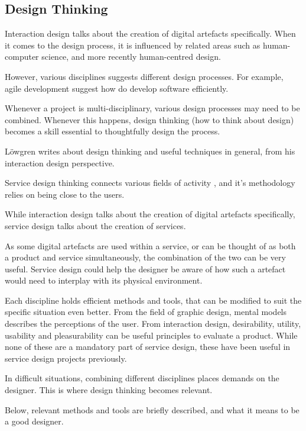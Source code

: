\subsection{Design Thinking}

%

Interaction design talks about the creation of digital artefacts specifically. When it comes to the design process, it is influenced by related areas such as human-computer science, and more recently human-centred design.

However, various disciplines suggests different design processes. For example, agile development suggest how do develop software efficiently.

Whenever a project is multi-disciplinary, various design processes may need to be combined. Whenever this happens, design thinking (how to think about design) becomes a skill essential to thoughtfully design the process.

Löwgren \citep{lowgren} writes about design thinking and useful techniques in general, from his interaction design perspective.

Service design thinking connects various fields of activity \citep{stickdorn}, and it's methodology relies on being close to the users.

While interaction design talks about the creation of digital artefacts specifically, service design talks about the creation of services.

As some digital artefacts are used within a service, or can be thought of as both a product and service simultaneously, the combination of the two can be very useful. Service design could help the designer be aware of how such a artefact would need to interplay with its physical environment.

Each discipline holds efficient methods and tools, that can be modified to suit the specific situation even better. From the field of graphic design, mental models describes the perceptions of the user. From interaction design, desirability, utility, usability and pleasurability can be useful principles to evaluate a product. While none of these are a mandatory part of service design, these have been useful in service design projects previously. \citep{stickdorn}

In difficult situations, combining different disciplines places demands on the designer. This is where design thinking becomes relevant.

Below, relevant methods and tools are briefly described, and what it means to be a good designer.

